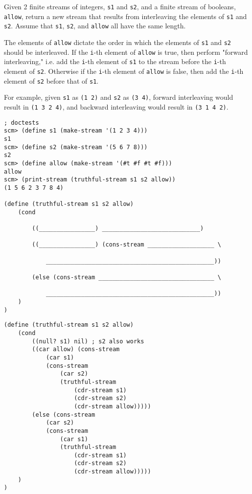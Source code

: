 \question
Given 2 finite streams of integers, \lstinline{s1} and \lstinline{s2}, and a finite stream of booleans, \lstinline{allow}, return a new stream that results from interleaving the elements of \lstinline{s1} and \lstinline{s2}. Assume that \lstinline{s1}, \lstinline{s2}, and \lstinline{allow} all have the same length.

The elements of \lstinline{allow} dictate the order in which the elements of \lstinline{s1} and \lstinline{s2} should be interleaved. If the \lstinline{i}-th element of \lstinline{allow} is true, then perform "forward interleaving," i.e. add the \lstinline{i}-th element of \lstinline{s1} to the stream before the \lstinline{i}-th element of \lstinline{s2}. Otherwise if the \lstinline{i}-th element of \lstinline{allow} is false, then add the \lstinline{i}-th element of \lstinline{s2} before that of \lstinline{s1}.

For example, given \lstinline{s1} as \lstinline{(1 2)} and \lstinline{s2} as \lstinline{(3 4)}, forward interleaving would result in \lstinline{(1 3 2 4)}, and backward interleaving would result in \lstinline{(3 1 4 2)}.

\begin{lstlisting}
; doctests
scm> (define s1 (make-stream '(1 2 3 4)))
s1
scm> (define s2 (make-stream '(5 6 7 8)))
s2
scm> (define allow (make-stream '(#t #f #t #f)))
allow
scm> (print-stream (truthful-stream s1 s2 allow))
(1 5 6 2 3 7 8 4)

(define (truthful-stream s1 s2 allow)
    (cond

        ((________________) ____________________________)

        ((________________) (cons-stream ___________________ \

            ________________________________________________))

        (else (cons-stream _________________________________ \

            ________________________________________________))
    )
)
\end{lstlisting}

\begin{blocksection}
\begin{solution}
\begin{lstlisting}
(define (truthful-stream s1 s2 allow)
    (cond
        ((null? s1) nil) ; s2 also works
        ((car allow) (cons-stream 
            (car s1) 
            (cons-stream 
                (car s2) 
                (truthful-stream 
                    (cdr-stream s1) 
                    (cdr-stream s2) 
                    (cdr-stream allow)))))
        (else (cons-stream 
            (car s2) 
            (cons-stream 
                (car s1) 
                (truthful-stream 
                    (cdr-stream s1) 
                    (cdr-stream s2) 
                    (cdr-stream allow)))))
    )
)
\end{lstlisting}
\end{solution}
\end{blocksection}